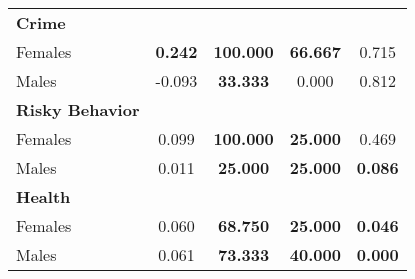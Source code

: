\begin{tabular}{l c c c c}
\midrule
\textbf{Crime} & & & & \\
\quad Females &  \textbf{    0.242} & \textbf{  100.000} & \textbf{   66.667} & 0.715 \\
\quad Males &     -0.093 & \textbf{   33.333} &     0.000 & 0.812 \\
\midrule
\textbf{Risky Behavior} & & & & \\
\quad Females &      0.099 & \textbf{  100.000} & \textbf{   25.000} & 0.469 \\
\quad Males &      0.011 & \textbf{   25.000} & \textbf{   25.000} & \textbf{ 0.086} \\
\midrule
\textbf{Health} & & & & \\
\quad Females &      0.060 & \textbf{   68.750} & \textbf{   25.000} & \textbf{0.046} \\
\quad Males &      0.061 & \textbf{   73.333} & \textbf{   40.000} & \textbf{0.000} \\
\bottomrule
\end{tabular}

